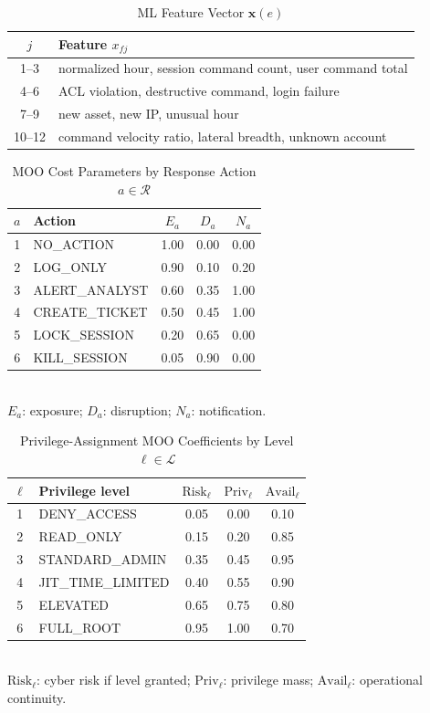 \begin{table}[H]
\caption{ML Feature Vector $\mathbf{x}(e)$}
\label{art-tab:features}
\centering
\footnotesize
\begin{tabular}{cl}
\toprule
\textbf{$j$} & \textbf{Feature $x_{fj}$} \\
\midrule
1--3 & normalized hour, session command count, user command total \\
4--6 & ACL violation, destructive command, login failure \\
7--9 & new asset, new IP, unusual hour \\
10--12 & command velocity ratio, lateral breadth, unknown account \\
\bottomrule
\end{tabular}
\end{table}

\begin{table}[H]
\caption{MOO Cost Parameters by Response Action $a\in\mathcal{R}$}
\label{art-tab:moo-costs}
\centering
\scriptsize
\begin{tabular}{@{}clccc@{}}
\toprule
$a$ & \textbf{Action} & $E_a$ & $D_a$ & $N_a$ \\
\midrule
1 & NO\_ACTION & 1.00 & 0.00 & 0.00 \\
2 & LOG\_ONLY & 0.90 & 0.10 & 0.20 \\
3 & ALERT\_ANALYST & 0.60 & 0.35 & 1.00 \\
4 & CREATE\_TICKET & 0.50 & 0.45 & 1.00 \\
5 & LOCK\_SESSION & 0.20 & 0.65 & 0.00 \\
6 & KILL\_SESSION & 0.05 & 0.90 & 0.00 \\
\bottomrule
\end{tabular}
\\[0.35em]
{\scriptsize $E_a$: exposure; $D_a$: disruption; $N_a$: notification.}
\end{table}

\begin{table}[H]
\caption{Privilege-Assignment MOO Coefficients by Level $\ell\in\mathcal{L}$}
\label{art-tab:priv-moo}
\centering
\scriptsize
\begin{tabular}{@{}clccc@{}}
\toprule
$\ell$ & \textbf{Privilege level} & $\mathrm{Risk}_{\ell}$ & $\mathrm{Priv}_{\ell}$ & $\mathrm{Avail}_{\ell}$ \\
\midrule
1 & DENY\_ACCESS & 0.05 & 0.00 & 0.10 \\
2 & READ\_ONLY & 0.15 & 0.20 & 0.85 \\
3 & STANDARD\_ADMIN & 0.35 & 0.45 & 0.95 \\
4 & JIT\_TIME\_LIMITED & 0.40 & 0.55 & 0.90 \\
5 & ELEVATED & 0.65 & 0.75 & 0.80 \\
6 & FULL\_ROOT & 0.95 & 1.00 & 0.70 \\
\bottomrule
\end{tabular}
\\[0.35em]
{\scriptsize $\mathrm{Risk}_{\ell}$: cyber risk if level granted; $\mathrm{Priv}_{\ell}$: privilege mass; $\mathrm{Avail}_{\ell}$: operational continuity.}
\end{table}

